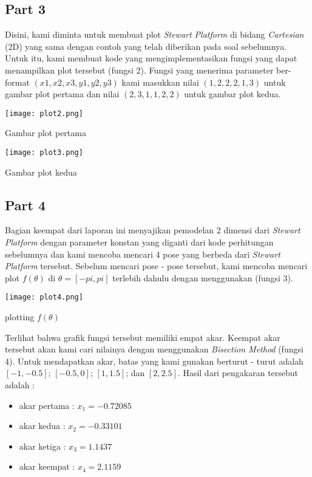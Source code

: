 \documentclass[11pt]{article}
\begin{document}
\begin{multicols}{2}
\subsection{Part 3}

Disini, kami diminta untuk membuat plot \textit{Stewart Platform} di bidang \textit{Cartesian} (2D) yang sama dengan contoh yang telah diberikan pada soal sebelumnya. Untuk itu, kami membuat kode yang mengimplementasikan fungsi yang dapat menampilkan plot tersebut (fungsi 2). Fungsi yang menerima parameter ber-format $(x1, x2, x3, y1, y2, y3)$ kami masukkan nilai $(1, 2, 2, 2, 1, 3)$ untuk gambar plot pertama dan nilai $(2, 3, 1, 1, 2, 2)$ untuk gambar plot kedua.


\texttt{[image: plot2.png]}

\centerline{Gambar plot pertama}

\texttt{[image: plot3.png]}

\centerline{Gambar plot kedua} %

\subsection{Part 4}

Bagian keempat dari laporan ini menyajikan pemodelan 2 dimensi dari \textit{Stewart Platform} dengan parameter konstan yang diganti dari kode perhitungan sebelumnya dan kami mencoba mencari 4 pose yang berbeda dari \textit{Stewart Platform} tersebut. Sebelum mencari pose - pose tersebut, kami mencoba mencari plot $f(\theta)$ di $\theta = [-pi, pi]$ terlebih dahulu dengan menggunakan (fungsi 3).

\texttt{[image: plot4.png]}
 
 \centerline{plotting $f(\theta)$}
\medskip
Terlihat bahwa grafik fungsi tersebut memiliki empat akar. Keempat akar tersebut akan kami cari nilainya dengan menggunakan \textit{Bisection Method} (fungsi 4). Untuk mendapatkan akar, batas yang kami gunakan berturut - turut adalah $[-1, -0.5]$; $[-0.5, 0]$; $[1, 1.5]$; dan $[2, 2.5]$. Hasil dari pengakaran tersebut adalah :
\begin{itemize}
    \item akar pertama : $x_1=-0.72085$
    \item akar kedua : $x_2=-0.33101$
    \item akar ketiga : $x_3=1.1437$
    \item akar keempat : $x_4=2.1159$
\end{itemize}


\end{multicols}
\end{document}
